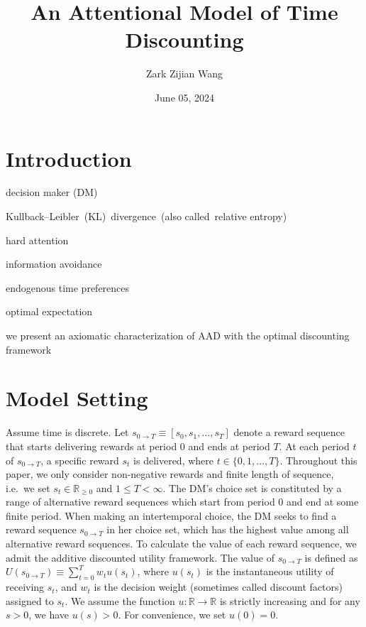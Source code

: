 \documentclass[
  12pt,
]{article}
\title{An Attentional Model of Time Discounting}
\author{Zark Zijian Wang}
\date{June 05, 2024}
\begin{document}
\maketitle

\hypertarget{introduction}{%
\section{Introduction}\label{introduction}}

decision maker (DM)

Kullback--Leibler~(KL)~divergence~(also called~relative entropy)

hard attention

information avoidance

endogenous time preferences

optimal expectation

we present an axiomatic characterization of AAD with the optimal
discounting framework

\hypertarget{model-setting}{%
\section{Model Setting}\label{model-setting}}

Assume time is discrete. Let
\(s_{0\rightarrow T}\equiv[s_0,s_1,...,s_T]\) denote a reward sequence
that starts delivering rewards at period 0 and ends at period \(T\). At
each period \(t\) of \(s_{0\rightarrow T}\), a specific reward \(s_t\)
is delivered, where \(t\in\{0,1,…,T\}\). Throughout this paper, we only
consider non-negative rewards and finite length of sequence, i.e.~we set
\(s_t \in \mathbb{R}_{\geq 0}\) and \(1\leq T<\infty\). The DM's choice
set is constituted by a range of alternative reward sequences which
start from period 0 and end at some finite period. When making an
intertemporal choice, the DM seeks to find a reward sequence
\(s_{0\rightarrow T}\) in her choice set, which has the highest value
among all alternative reward sequences. To calculate the value of each
reward sequence, we admit the additive discounted utility framework. The
value of \(s_{0\rightarrow T}\) is defined as
\(U(s_{0\rightarrow T})\equiv \sum_{t=0}^T w_{t}u(s_t)\), where
\(u(s_t)\) is the instantaneous utility of receiving \(s_t\), and
\(w_t\) is the decision weight (sometimes called discount factors)
assigned to \(s_t\). We assume the function
\(u:\mathbb{R}\rightarrow \mathbb{R}\) is strictly increasing and for
any \(s>0\), we have \(u(s)>0\). For convenience, we set \(u(0)=0\).
\end{document}
